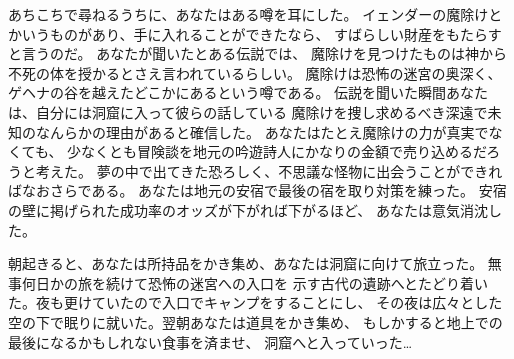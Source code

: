 あちこちで尋ねるうちに、あなたはある噂を耳にした。
イェンダーの魔除けとかいうものがあり、手に入れることができたなら、
すばらしい財産をもたらすと言うのだ。
あなたが聞いたとある伝説では、
魔除けを見つけたものは神から不死の体を授かるとさえ言われているらしい。
魔除けは恐怖の迷宮の奥深く、ゲヘナの谷を越えたどこかにあるという噂である。
伝説を聞いた瞬間あなたは、自分には洞窟に入って彼らの話している
魔除けを捜し求めるべき深遠で未知のなんらかの理由があると確信した。
あなたはたとえ魔除けの力が真実でなくても、
少なくとも冒険談を地元の吟遊詩人にかなりの金額で売り込めるだろうと考えた。
夢の中で出てきた恐ろしく、不思議な怪物に出会うことができればなおさらである。
あなたは地元の安宿で最後の宿を取り対策を練った。
安宿の壁に掲げられた成功率のオッズが下がれば下がるほど、
あなたは意気消沈した。

\nd 朝起きると、あなたは所持品をかき集め、あなたは洞窟に向けて旅立った。
無事何日かの旅を続けて恐怖の迷宮への入口を
示す古代の遺跡へとたどり着いた。夜も更けていたので入口でキャンプをすることにし、
その夜は広々とした空の下で眠りに就いた。翌朝あなたは道具をかき集め、
もしかすると地上での最後になるかもしれない食事を済ませ、
洞窟へと入っていった…

